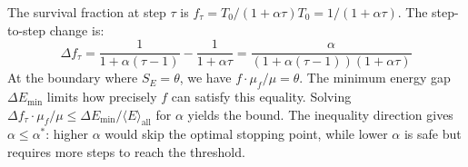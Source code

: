 \documentclass[11pt]{article}
\theoremstyle{remark}
\begin{document}
The survival fraction at step $\tau$ is $f_\tau = T_0/(1 + \alpha\tau)T_0
= 1/(1 + \alpha\tau)$. The step-to-step change is:
\begin{equation}
    \Delta f_\tau = \frac{1}{1 + \alpha(\tau-1)} - \frac{1}{1 + \alpha\tau}
    = \frac{\alpha}{(1 + \alpha(\tau-1))(1 + \alpha\tau)}
\end{equation}
At the boundary where $S_E = \theta$, we have $f \cdot \mu_f / \mu = \theta$.
The minimum energy gap $\Delta E_{\min}$ limits how precisely $f$ can
satisfy this equality. Solving $\Delta f_\tau \cdot \mu_f / \mu \leq
\Delta E_{\min} / \langle E \rangle_{\text{all}}$ for $\alpha$ yields
the bound. The inequality direction gives $\alpha \leq \alpha^*$: higher
$\alpha$ would skip the optimal stopping point, while lower $\alpha$ is
safe but requires more steps to reach the threshold.



\end{document}
